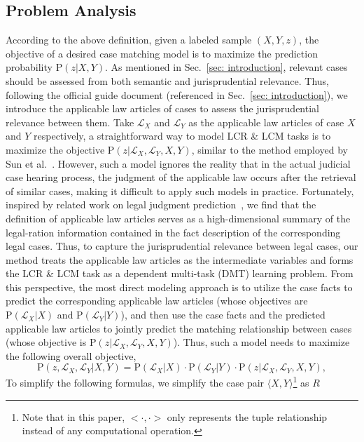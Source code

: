 \subsection{Problem Analysis}\label{sec:analysis}
According to the above definition, given a labeled sample $(X, Y, z)$, the objective of a desired case matching model is to maximize the prediction probability $\mathrm{P}(z|X, Y)$.
As mentioned in Sec.~\ref{sec: introduction}, relevant cases should be assessed from both semantic and jurisprudential relevance.
Thus, following the official guide document (referenced in Sec.~\ref{sec: introduction}), we introduce the applicable law articles of cases to assess the jurisprudential relevance between them.
Take $\mathcal{L}_X$ and $\mathcal{L}_Y$ as the applicable law articles of case $X$ and $Y$ respectively, 
a straightforward way to model LCR \& LCM tasks is to maximize the objective $\mathrm{P}(z|\mathcal{L}_X, \mathcal{L}_Y, X, Y)$, similar to the method employed by Sun et al.~\cite{sun2023law}.
However, such a model ignores the reality that in the actual judicial case hearing process, the judgment of the applicable law occurs after the retrieval of similar cases, making it difficult to apply such models in practice.
Fortunately, inspired by related work on legal judgment prediction~\cite{xu2020LADAN,LJP@TOIS2024_XN,zhong2018Topology,yue2021Neurjudge}, we find that the definition of applicable law articles serves as a high-dimensional summary of the legal-ration information contained in the fact description of the corresponding legal cases.
Thus, to capture the jurisprudential relevance between legal cases, our method treats the applicable law articles as the intermediate variables and forms the LCR \& LCM task as a dependent multi-task (DMT) learning problem.
From this perspective, the most direct modeling approach is to utilize the case facts to predict the corresponding applicable law articles (whose objectives are $\mathrm{P}(\mathcal{L}_X|X)$ and $\mathrm{P}(\mathcal{L}_Y|Y)$), and then use the case facts and the predicted applicable law articles to jointly predict the matching relationship between cases (whose objective is $\mathrm{P}(z|\mathcal{L}_X, \mathcal{L}_Y, X, Y)$).
Thus, such a model needs to maximize the following overall objective,
$$
\mathrm{P}(z, \mathcal{L}_X, \mathcal{L}_Y | X, Y ) = \mathrm{P}(\mathcal{L}_X|X) \cdot \mathrm{P}(\mathcal{L}_Y|Y) 
\cdot \mathrm{P}(z| \mathcal{L}_X, \mathcal{L}_Y,  X, Y),
$$
To simplify the following formulas, we simplify the case pair $\langle X, Y \rangle$\footnote{Note that in this paper, $<\cdot, \cdot>$ only represents the tuple relationship instead of any computational operation.} as $R$ 
